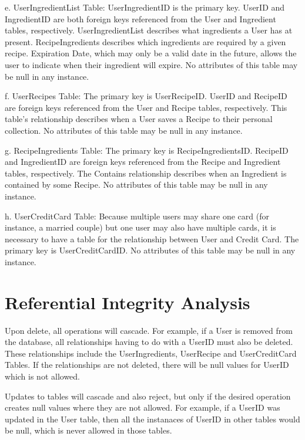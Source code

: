 \documentclass{article}
\begin{document}
e.	UserIngredientList Table: UserIngredientID is the primary key. UserID and IngredientID are both foreign keys referenced from the User and Ingredient tables, respectively.  UserIngredientList describes what ingredients a User has at present. RecipeIngredients describes which ingredients are required by a given recipe. Expiration Date, which may only be a valid date in the future, allows the user to indicate when their ingredient will expire. No attributes of this table may be null in any instance. 

f.	UserRecipes Table: The primary key is UserRecipeID. UserID and RecipeID are foreign keys referenced from the User and Recipe tables, respectively. This table's relationship describes when a User saves a Recipe to their personal collection. No attributes of this table may be null in any instance.
 
g.	RecipeIngredients Table:  The primary key is RecipeIngredientsID. RecipeID and IngredientID are foreign keys referenced from the Recipe and Ingredient tables, respectively. The Contains relationship describes when an Ingredient is contained by some Recipe. No attributes of this table may be null in any instance.

h.	UserCreditCard Table: Because multiple users may share one card (for instance, a married couple) but one user may also have multiple cards, it is necessary to have a table for the relationship between User and Credit Card. The primary key is UserCreditCardID. No attributes of this table may be null in any instance.

\section{Referential Integrity Analysis}
Upon delete, all operations will cascade. For example, if a User is removed from the database, all relationships having to do with a UserID must also be deleted. These relationships include the UserIngredients, UserRecipe and UserCreditCard Tables. If the relationships are not deleted, there will be null values for UserID which is not allowed.

Updates to tables will cascade and also reject, but only if the desired operation creates null values where they are not allowed. For example, if a UserID was updated in the User table, then all the instanaces of UserID in other tables would be null, which is never allowed in those tables.
\end{document}
